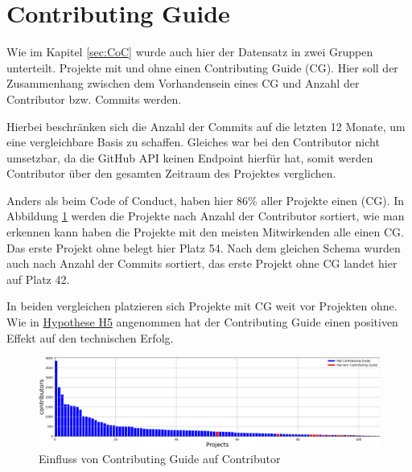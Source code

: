 


\section{Contributing Guide}


Wie im Kapitel \ref{sec:CoC} wurde auch hier der Datensatz in zwei Gruppen unterteilt. Projekte mit
und ohne einen Contributing Guide (CG). Hier soll der Zusammenhang zwischen dem Vorhandensein eines
CG und Anzahl der Contributor bzw. Commits  werden.

Hierbei beschränken sich die Anzahl der Commits auf die letzten 12 Monate, um eine vergleichbare
Basis zu schaffen. Gleiches war bei den Contributor nicht umsetzbar, da die GitHub API keinen
Endpoint hierfür hat, somit werden Contributor über den gesamten Zeitraum des Projektes verglichen.

Anders als beim Code of Conduct, haben hier 86\% aller Projekte einen (CG).
In Abbildung \ref{abb:ContributingGuide_vs_Contributors} werden die Projekte nach Anzahl der Contributor
sortiert, wie man erkennen kann haben die Projekte mit den meisten Mitwirkenden alle einen CG. Das
erste Projekt ohne belegt hier Platz 54. Nach dem gleichen Schema wurden auch nach Anzahl der Commits
sortiert, das erste Projekt ohne CG landet hier auf Platz 42.

In beiden vergleichen platzieren sich Projekte mit CG weit vor Projekten ohne. Wie in \hyperref[H:5]
{Hypothese H5} angenommen hat der Contributing Guide einen positiven Effekt auf den technischen Erfolg.

\begin{figure}[h]
    \centering
    \includegraphics[scale=0.42]{figures/05/Contributors_Projects_asBarChart.png}
    \caption{Einfluss von Contributing Guide auf Contributor}
    \label{abb:ContributingGuide_vs_Contributors}
\end{figure}

